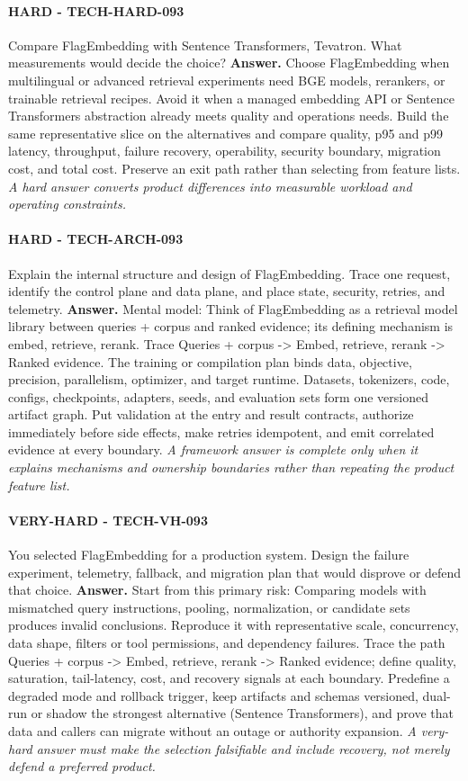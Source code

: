 \paragraph{HARD - TECH-HARD-093} Compare FlagEmbedding with Sentence Transformers, Tevatron. What measurements would decide the choice?
\textbf{Answer.} Choose FlagEmbedding when multilingual or advanced retrieval experiments need BGE models, rerankers, or trainable retrieval recipes. Avoid it when a managed embedding API or Sentence Transformers abstraction already meets quality and operations needs. Build the same representative slice on the alternatives and compare quality, p95 and p99 latency, throughput, failure recovery, operability, security boundary, migration cost, and total cost. Preserve an exit path rather than selecting from feature lists.
\textit{A hard answer converts product differences into measurable workload and operating constraints.}
\paragraph{HARD - TECH-ARCH-093} Explain the internal structure and design of FlagEmbedding. Trace one request, identify the control plane and data plane, and place state, security, retries, and telemetry.
\textbf{Answer.} Mental model: Think of FlagEmbedding as a retrieval model library between queries + corpus and ranked evidence; its defining mechanism is embed, retrieve, rerank. Trace Queries + corpus -> Embed, retrieve, rerank -> Ranked evidence. The training or compilation plan binds data, objective, precision, parallelism, optimizer, and target runtime. Datasets, tokenizers, code, configs, checkpoints, adapters, seeds, and evaluation sets form one versioned artifact graph. Put validation at the entry and result contracts, authorize immediately before side effects, make retries idempotent, and emit correlated evidence at every boundary.
\textit{A framework answer is complete only when it explains mechanisms and ownership boundaries rather than repeating the product feature list.}
\paragraph{VERY-HARD - TECH-VH-093} You selected FlagEmbedding for a production system. Design the failure experiment, telemetry, fallback, and migration plan that would disprove or defend that choice.
\textbf{Answer.} Start from this primary risk: Comparing models with mismatched query instructions, pooling, normalization, or candidate sets produces invalid conclusions. Reproduce it with representative scale, concurrency, data shape, filters or tool permissions, and dependency failures. Trace the path Queries + corpus -> Embed, retrieve, rerank -> Ranked evidence; define quality, saturation, tail-latency, cost, and recovery signals at each boundary. Predefine a degraded mode and rollback trigger, keep artifacts and schemas versioned, dual-run or shadow the strongest alternative (Sentence Transformers), and prove that data and callers can migrate without an outage or authority expansion.
\textit{A very-hard answer must make the selection falsifiable and include recovery, not merely defend a preferred product.}
